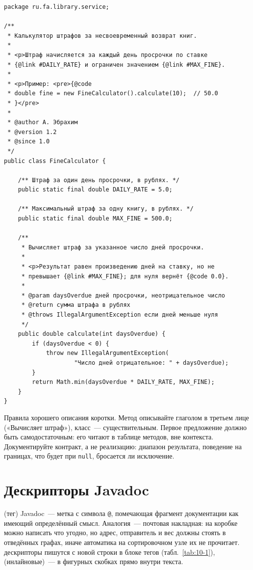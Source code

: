 \begin{listing}[H]
\begin{verbatim}
package ru.fa.library.service;

/**
 * Калькулятор штрафов за несвоевременный возврат книг.
 *
 * <p>Штраф начисляется за каждый день просрочки по ставке
 * {@link #DAILY_RATE} и ограничен значением {@link #MAX_FINE}.
 *
 * <p>Пример: <pre>{@code
 * double fine = new FineCalculator().calculate(10);  // 50.0
 * }</pre>
 *
 * @author А. Эбрахим
 * @version 1.2
 * @since 1.0
 */
public class FineCalculator {

    /** Штраф за один день просрочки, в рублях. */
    public static final double DAILY_RATE = 5.0;

    /** Максимальный штраф за одну книгу, в рублях. */
    public static final double MAX_FINE = 500.0;

    /**
     * Вычисляет штраф за указанное число дней просрочки.
     *
     * <p>Результат равен произведению дней на ставку, но не
     * превышает {@link #MAX_FINE}; для нуля вернёт {@code 0.0}.
     *
     * @param daysOverdue дней просрочки, неотрицательное число
     * @return сумма штрафа в рублях
     * @throws IllegalArgumentException если дней меньше нуля
     */
    public double calculate(int daysOverdue) {
        if (daysOverdue < 0) {
            throw new IllegalArgumentException(
                    "Число дней отрицательное: " + daysOverdue);
        }
        return Math.min(daysOverdue * DAILY_RATE, MAX_FINE);
    }
}
\end{verbatim}
\caption{Полностью документированный класс}
\label{lst:10-1}
\end{listing}

Правила хорошего описания коротки. Метод описывайте глаголом в третьем лице («Вычисляет штраф»), класс~--- существительным. Первое предложение должно быть самодостаточным: его читают в таблице методов, вне контекста. Документируйте контракт, а не реализацию: диапазон результата, поведение на границах, что будет при \texttt{null}, бросается ли исключение.

\section{Дескрипторы Javadoc}

 (тег) Javadoc~--- метка с символа \texttt{@}, помечающая фрагмент документации как имеющий определённый смысл. Аналогия~--- почтовая накладная: на коробке можно написать что угодно, но адрес, отправитель и вес должны стоять в отведённых графах, иначе автоматика на сортировочном узле их не прочитает.  дескрипторы пишутся с новой строки в блоке тегов (табл.~\ref{tab:10-1}),  (инлайновые)~--- в фигурных скобках прямо внутри текста.

